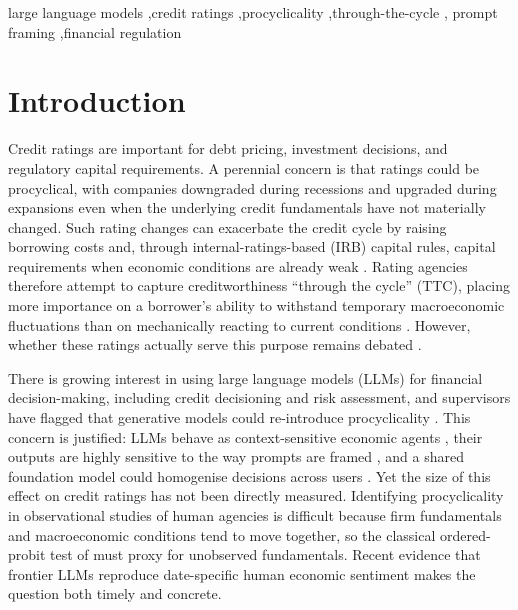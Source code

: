 \documentclass[a4paper,fleqn]{cas-sc}
\begin{document}
\begin{keywords}
large language models \sep credit ratings \sep procyclicality \sep through-the-cycle \sep
prompt framing \sep financial regulation
\end{keywords}

\maketitle

\section{Introduction}\label{sec:intro}
Credit ratings are important for debt pricing, investment decisions, and regulatory capital
requirements. A perennial concern is that ratings could be procyclical, with companies downgraded
during recessions and upgraded during expansions even when the underlying credit fundamentals have not
materially changed. Such rating changes can exacerbate the credit cycle by raising borrowing costs and,
through internal-ratings-based (IRB) capital rules, capital requirements when economic conditions are
already weak \citep{kashyap2004,gordy2006}. Rating agencies therefore attempt to capture
creditworthiness ``through the cycle'' (TTC), placing more importance on a borrower's ability to
withstand temporary macroeconomic fluctuations than on mechanically reacting to current conditions
\citep{amato2004,loffler2004}. However, whether these ratings actually serve this purpose remains
debated \citep{loffler2013}.

There is growing interest in using large language models (LLMs) for financial decision-making,
including credit decisioning and risk assessment, and supervisors have flagged that generative models
could re-introduce procyclicality \citep{bis2024}. This concern is justified: LLMs behave as
context-sensitive economic agents \citep{horton2023,binz2023}, their outputs are highly sensitive to
the way prompts are framed \citep{tversky1981}, and a shared foundation model could homogenise
decisions across users \citep{bommasani2022}. Yet the size of this effect on credit ratings has not
been directly measured. Identifying procyclicality in observational studies of human agencies is
difficult because firm fundamentals and macroeconomic conditions tend to move together, so the
classical ordered-probit test of \citet{amato2004} must proxy for unobserved fundamentals. Recent
evidence that frontier LLMs reproduce date-specific human economic sentiment \citep{graham2026} makes
the question both timely and concrete.
\end{document}
